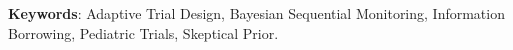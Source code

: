 \documentclass[12pt]{article}
\begin{document}
\vspace{1.5cm}
\noindent
\textbf{Keywords}:
 Adaptive Trial Design, Bayesian Sequential Monitoring, Information Borrowing, Pediatric Trials, Skeptical Prior.


\newpage

\renewcommand\thesection{\arabic{section}}
\renewcommand\thesubsection{\arabic{section}.\arabic{subsection}}



%

%
\end{document}
